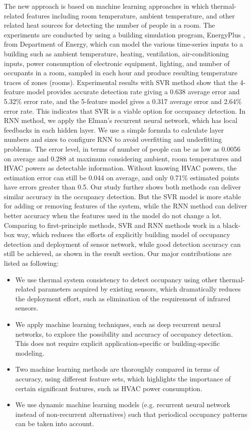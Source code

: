 The new approach is based on machine learning
  approaches in which thermal-related features including room
  temperature, ambient temperature, and other related heat sources for
  detecting the number of people in a room.  The experiments are
  conducted by using a building simulation program,
  EnergyPlus \cite{energyplus:2001vf}, from Department of Energy,
  which can model the various time-series inputs to a building such as
  ambient temperature, heating, ventilation, air-conditioning
  inputs, power consumption of electronic equipment, lighting, and
  number of occupants in a room, sampled in each hour and produce
  resulting temperature traces of zones (rooms).  Experimental
results with SVR method show that the 4-feature model provides accurate
detection rate giving a 0.638 average error and 5.32\% error rate, and
the 5-feature model gives a 0.317 average error and 2.64\% error
rate. This indicates that SVR is a viable option for occupancy
detection.  In RNN method, we apply the Elman's recurrent neural
network, which has local feedbacks in each hidden layer. We use a simple
formula to calculate layer numbers and sizes to configure RNN
to avoid overfitting and underfitting problems. The error
level, in terms of number of people can be as low as 0.0056 on average
and 0.288 at maximum considering ambient, room temperatures and HVAC
powers as detectable information. Without knowing HVAC powers, the
estimation error can still be 0.044 on average, and only 0.71\%
estimated points have errors greater than 0.5. Our study further shows
both methods can deliver similar accuracy in the occupancy
detection. But the SVR model is more stable for
  adding or removing features of the system, while the RNN method can
  deliver better accuracy when the features used in the model do not
  change a lot. Comparing to first-principle methods, SVR and
  RNN methods work in a black-box way, which reduces the efforts of
  explicitly building model of occupancy detection and deployment of sensor
  network, while good detection accuracy can still be achieved, as shown in the
  result section. Our major contributions are listed as
  following:
\begin{itemize}
\item We use thermal system consistency to detect occupancy using other
    thermal-related parameters acquired by existing sensors, which dramatically
    reduces the deployment effort, such as elimination of the requirement
    of infrared sensors.
\item We apply machine learning techniques, such as deep recurrent neural
    networks, to explore the possibility and accuracy of occupancy detection.
    This does not require explicit application-specific or building-specific
    modeling.
\item Two machine learning methods are thoroughly compared in terms of accuracy,
    using different feature sets, which highlights the importance of certain
    significant features, such as HVAC power consumption.
\item We use dynamic machine learning models (e.g. recurrent neural network
    instead of non-recurrent alternatives) such that periodical occupancy
    patterns can be taken into account.
\end{itemize}


